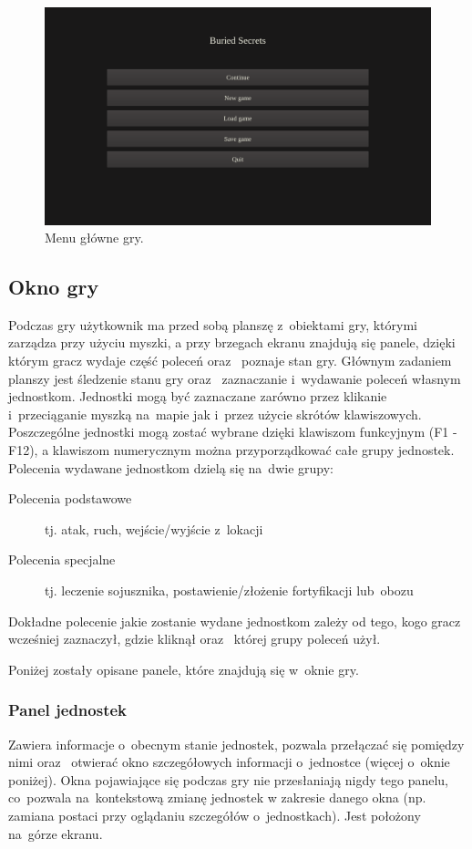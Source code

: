 \documentclass[licencjacka]{pracamgr}
\begin{document}
      \begin{figure}[htbp]
	\centering
	\includegraphics[scale=0.22]{MainMenu.png}
	\caption{Menu główne gry.}
      \end{figure}

    \subsection{Okno gry}
      Podczas gry użytkownik ma przed sobą planszę z~obiektami gry, którymi zarządza przy użyciu myszki, a przy brzegach ekranu znajdują się panele,
      dzięki którym gracz wydaje część poleceń oraz~ poznaje stan gry. Głównym zadaniem planszy jest śledzenie stanu gry oraz~ zaznaczanie i~wydawanie poleceń
      własnym jednostkom. Jednostki mogą być zaznaczane zarówno przez klikanie i~przeciąganie myszką na~mapie jak i~przez użycie skrótów klawiszowych.
      Poszczególne jednostki mogą zostać wybrane dzięki klawiszom funkcyjnym (F1 - F12), a klawiszom numerycznym można przyporządkować całe grupy jednostek.
      Polecenia wydawane jednostkom dzielą się na~dwie grupy:
      \begin{description}
       \item[Polecenia podstawowe] tj. atak, ruch, wejście/wyjście z~lokacji
       \item[Polecenia specjalne] tj. leczenie sojusznika, postawienie/złożenie fortyfikacji lub~obozu
      \end{description}
      Dokładne polecenie jakie zostanie wydane jednostkom zależy od tego, kogo gracz wcześniej zaznaczył, gdzie kliknął oraz~ której grupy poleceń użył.

      Poniżej zostały opisane panele, które znajdują się w~oknie gry.

      \subsubsection{Panel jednostek}
	Zawiera informacje o~obecnym stanie jednostek, pozwala przełączać się pomiędzy nimi oraz~ otwierać okno szczegółowych informacji o~jednostce
	(więcej o~oknie poniżej). Okna pojawiające się podczas gry nie przesłaniają nigdy tego panelu, co~pozwala na~kontekstową zmianę jednostek
	w zakresie danego okna (np. zamiana postaci przy oglądaniu szczegółów o~jednostkach). Jest położony na~górze ekranu.
\end{document}
